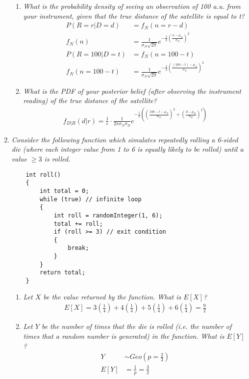 \documentclass{article} %
\begin{document}
\begin{enumerate}
\begin{enumerate}
		\item \textit{What is the probability density of seeing an observation of 100 a.u. from your instrument, given that the true distance of the satellite is equal to t?}
		\begin{align*}
		P(R = r | D = d) &= f_N(n = r - d)\\
		f_N(n) &= \frac{1}{\sigma_N \sqrt{2 \pi}} e^{-\frac{1}{2}(\frac{n - \mu_N}{\sigma_N})^2}\\
		P(R = 100 | D = t) &= f_N(n = 100 - t)\\
		f_N(n = 100 - t) &= \frac{1}{\sigma_N \sqrt{2 \pi}} e^{-\frac{1}{2}(\frac{(100 - t) - \mu_N}{\sigma_N})^2}
		\end{align*}
		
		\item \textit{What is the PDF of your posterior belief (after observing the instrument reading) of the true distance of the satellite?}
		\begin{align*}
		f_{D|R}(d | r) = \frac{1}{c} \cdot \frac{1}{2 \pi \sigma_N \sigma_D} e^{-\frac{1}{2} ((\frac{100 - t - \mu_N}{\sigma_N})^2 + (\frac{d - \mu_D}{\sigma_D})^2)}
		\end{align*}
		
	\end{enumerate}
	
	\item \textit{Consider the following function which simulates repeatedly rolling a 6-sided die (where each integer value from 1 to 6 is equally likely to be rolled) until a value $\geq 3$ is rolled.}
	\begin{lstlisting}
	int roll()
	{
		int total = 0;
		while (true) // infinite loop
		{
			int roll = randomInteger(1, 6);
			total += roll;
			if (roll >= 3) // exit condition
			{
				break;
			}
		}
		return total;
	}
	\end{lstlisting}
	\begin{enumerate}
		\item \textit{Let $X$ be the value returned by the function. What is $E[X]$?}
		\begin{align*}
		E[X] = 3(\frac{1}{4}) + 4(\frac{1}{4}) + 5(\frac{1}{4}) + 6(\frac{1}{4}) = \frac{9}{2}
		\end{align*}
		
		\item \textit{Let $Y$ be the number of times that the die is rolled (i.e. the number of times that a random number is generated) in the function. What is $E[Y]$?}
		\begin{align*}
		Y &\sim Geo(p = \frac{2}{3})\\
		E[Y] &= \frac{1}{p} = \frac{3}{2}
		\end{align*}			
		

\end{enumerate}
\end{enumerate}
\end{document}
